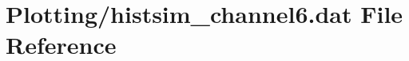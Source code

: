 \hypertarget{Plotting_2histsim__channel6_8dat}{}\section{Plotting/histsim\+\_\+channel6.dat File Reference}
\label{Plotting_2histsim__channel6_8dat}
